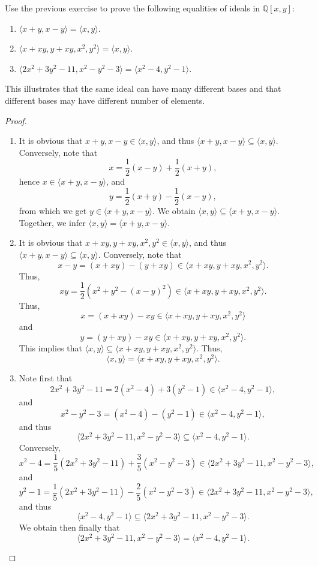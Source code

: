 \begin{exercise}{3}
    Use the previous exercise to prove the following equalities of ideals in $\mathbb{Q}[x,y]$:
    \begin{enumerate}
        \item $\langle x+y,x-y\rangle = \langle x,y\rangle$.
        \item $\langle x+xy, y+xy, x^2, y^2\rangle = \langle x,y\rangle$.
        \item $\langle 2x^2 + 3y^2 - 11, x^2 - y^2 - 3\rangle = \langle x^2 - 4, y^2 -1\rangle$.
    \end{enumerate}
    This illustrates that the same ideal can have many different bases and that different bases may have different number of elements.
\end{exercise}
\begin{proof}
    \begin{enumerate}
        \item It is obvious that $x+y, x-y\in \langle x,y\rangle$, and thus $\langle x+y,x-y\rangle \subseteq \langle x,y\rangle$. Conversely, note that
        $$x = \frac{1}{2}(x-y) + \frac{1}{2}(x+y),$$
        hence $x\in \langle x+y,x-y\rangle$, and
        $$y = \frac{1}{2}(x+y) - \frac{1}{2}(x-y),$$
        from which we get $y\in \langle x+y,x-y\rangle$. We obtain $\langle x,y\rangle \subseteq \langle x+y,x-y\rangle$. Together, we infer $\langle x,y\rangle = \langle x+y,x-y\rangle$.
        \item It is obvious that $x+xy, y+xy, x^2, y^2\in \langle x,y\rangle$, and thus $\langle x+y,x-y\rangle \subseteq \langle x,y\rangle$. Conversely, note that
        $$x-y = (x+xy) - (y+xy)\in \langle x+xy, y+xy, x^2, y^2\rangle.$$
        Thus,
        $$xy = \frac{1}{2}(x^2 + y^2 - (x-y)^2)\in \langle x+xy, y+xy, x^2, y^2\rangle.$$
        Thus,
        $$x = (x+xy) - xy \in \langle x+xy, y+xy, x^2, y^2\rangle$$
        and
        $$y = (y+xy) - xy \in \langle x+xy, y+xy, x^2, y^2\rangle.$$
        This implies that $\langle x,y\rangle \subseteq \langle x+xy, y+xy, x^2, y^2\rangle$. Thus,
        $$\langle x,y\rangle = \langle x+xy, y+xy, x^2, y^2\rangle.$$
        \item Note first that
        $$2x^2 + 3y^2 - 11 = 2(x^2 - 4) + 3(y^2 - 1)\in \langle x^2 - 4, y^2 - 1\rangle,$$
        and
        $$x^2 - y^2 - 3 = (x^2 - 4) - (y^2 - 1)\in \langle x^2 - 4, y^2 - 1\rangle,$$
        and thus
        $$\langle 2x^2 + 3y^2 - 11, x^2 - y^2 - 3\rangle \subseteq \langle x^2 - 4, y^2 -1\rangle.$$
        Conversely,
        $$x^2 - 4 = \frac{1}{5}(2x^2 + 3y^2 - 11) + \frac{3}{5}(x^2 - y^2 - 3)\in \langle 2x^2 + 3y^2 - 11, x^2 - y^2 - 3\rangle,$$
        and
        $$y^2 -1 = \frac{1}{5}(2x^2 + 3y^2 - 11) - \frac{2}{5}(x^2 - y^2 - 3)\in \langle 2x^2 + 3y^2 - 11, x^2 - y^2 - 3\rangle,$$
        and thus
        $$\langle x^2 - 4, y^2 -1\rangle\subseteq \langle 2x^2 + 3y^2 - 11, x^2 - y^2 - 3\rangle.$$
        We obtain then finally that
        $$\langle 2x^2 + 3y^2 - 11, x^2 - y^2 - 3\rangle = \langle x^2 - 4, y^2 -1\rangle.$$
    \end{enumerate}
\end{proof}

